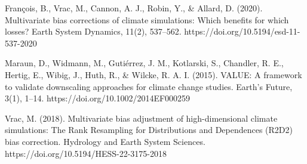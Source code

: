 \documentclass[letterpaper,10pt]{article}
\begin{document}
\begin{thebibliography}{6}
 François, B., Vrac, M., Cannon, A. J., Robin, Y., \& Allard, D. (2020). Multivariate bias corrections of climate simulations: Which benefits for which losses? Earth System Dynamics, 11(2), 537–562. https://doi.org/10.5194/esd-11-537-2020

 Maraun, D., Widmann, M., Gutiérrez, J. M., Kotlarski, S., Chandler, R. E., Hertig, E., Wibig, J., Huth, R., \& Wilcke, R. A. I. (2015). VALUE: A framework to validate downscaling approaches for climate change studies. Earth’s Future, 3(1), 1–14. https://doi.org/10.1002/2014EF000259

 Vrac, M. (2018). Multivariate bias adjustment of high-dimensional climate simulations: The Rank Resampling for Distributions and Dependences (R2D2) bias correction. Hydrology and Earth System Sciences. https://doi.org/10.5194/HESS-22-3175-2018


\end{thebibliography}
\end{document}
